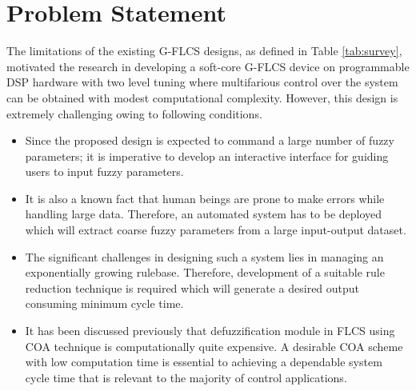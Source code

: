 \section{Problem Statement}
The limitations of the existing G\hyp{}FLCS designs, as defined in Table \ref{tab:survey}, motivated the research in developing a soft\hyp{}core G\hyp{}FLCS device on programmable DSP hardware with two level tuning where multifarious control over the system can be obtained with modest computational complexity. However, this design is extremely challenging owing to following conditions.
\begin{itemize}
\item Since the proposed design is expected to command a large number of fuzzy parameters; it is imperative to develop an interactive interface for guiding users to input fuzzy parameters.
\item It is also a known fact that human beings are prone to make errors while handling large data. Therefore, an automated system has to be deployed which will extract coarse fuzzy parameters from a large input\hyp{}output dataset.
\item The significant challenges in designing such a system lies in managing an exponentially growing rulebase. Therefore, development of a suitable rule reduction technique is required which will generate a desired output consuming minimum cycle time.
\item It has been discussed previously that defuzzification module in FLCS using COA technique is computationally quite expensive. A desirable COA scheme with low computation time is essential to achieving a dependable system cycle time that is relevant to the majority of control applications.
\end{itemize}

